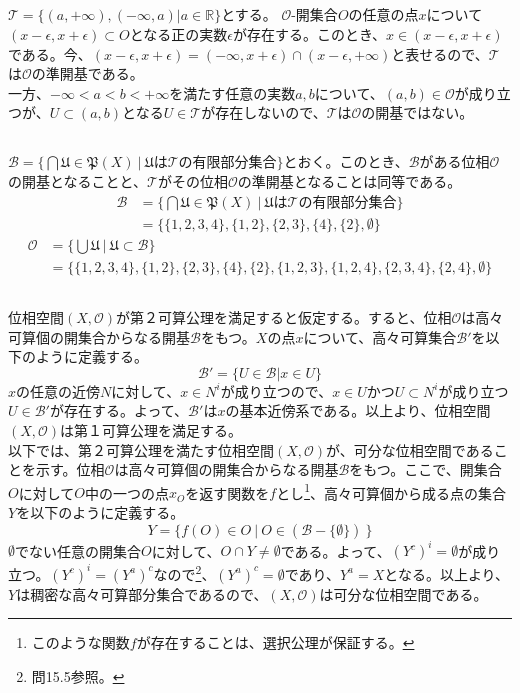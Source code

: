 \documentclass{jsarticle}
\begin{document}
\subsection{}
$\mathcal{T}=\{(a,+\infty),(-\infty,a)|a\in\mathbb{R}\}$とする。
$\mathcal{O}$-開集合$O$の任意の点$x$について$(x-\epsilon,x+\epsilon)\subset O$となる正の実数$\epsilon$が存在する。このとき、$x\in(x-\epsilon,x+\epsilon)$である。今、$(x-\epsilon,x+\epsilon)=(-\infty,x+\epsilon)\cap(x-\epsilon,+\infty)$と表せるので、$\mathcal{T}$は$\mathcal{O}$の準開基である。\\
一方、$-\infty<a<b<+\infty$を満たす任意の実数$a,b$について、$(a,b)\in\mathcal{O}$が成り立つが、$U\subset(a,b)$となる$U\in\mathcal{T}$が存在しないので、$\mathcal{T}$は$\mathcal{O}$の開基ではない。


\subsection{}
$\mathcal{B}=\{\bigcap\mathfrak{U}\in\mathfrak{P}(X)\ |\ \mathfrak{U}は\mathcal{T}の有限部分集合\}$とおく。このとき、$\mathcal{B}$がある位相$\mathcal{O}$の開基となることと、$\mathcal{T}$がその位相$\mathcal{O}$の準開基となることは同等である。
\begin{align*}
\mathcal{B}&=\{\bigcap\mathfrak{U}\in\mathfrak{P}(X)\ |\ \mathfrak{U}は\mathcal{T}の有限部分集合\}\\
&=\{\{1,2,3,4\},\{1,2\},\{2,3\},\{4\},\{2\},\emptyset\}
\end{align*}
\begin{align*}
\mathcal{O}&=\{\bigcup\mathfrak{U}\ |\ \mathfrak{U}\subset\mathcal{B}\}\\
&=\{\{1,2,3,4\},\{1,2\},\{2,3\},\{4\},\{2\},\{1,2,3\},\{1,2,4\},\{2,3,4\},\{2,4\},\emptyset\}
\end{align*}



\subsection{}
位相空間$(X,\mathcal{O})$が第２可算公理を満足すると仮定する。すると、位相$\mathcal{O}$は高々可算個の開集合からなる開基$\mathcal{B}$をもつ。$X$の点$x$について、高々可算集合$\mathcal{B}'$を以下のように定義する。
\[\mathcal{B}'=\{U\in\mathcal{B}| x\in U\}\]
$x$の任意の近傍$N$に対して、$x\in N^i$が成り立つので、$x\in U$かつ$U\subset N^i$が成り立つ$U\in\mathcal{B}'$が存在する。よって、$\mathcal{B}'$は$x$の基本近傍系である。以上より、位相空間$(X,\mathcal{O})$は第１可算公理を満足する。\\
以下では、第２可算公理を満たす位相空間$(X,\mathcal{O})$が、可分な位相空間であることを示す。位相$\mathcal{O}$は高々可算個の開集合からなる開基$\mathcal{B}$をもつ。ここで、開集合$O$に対して$O$中の一つの点$x_O$を返す関数を$f$とし\footnote{このような関数$f$が存在することは、選択公理が保証する。}、高々可算個から成る点の集合$Y$を以下のように定義する。
\[Y=\{f(O)\in O\ |\ O\in(\mathcal{B}-\{\emptyset\})\ \}\]
$\emptyset$でない任意の開集合$O$に対して、$O\cap Y\neq \emptyset$である。よって、$(Y^c)^i=\emptyset$が成り立つ。$(Y^c)^i=(Y^a)^c$なので\footnote{問15.5参照。}、$(Y^a)^c=\emptyset$であり、$Y^a=X$となる。以上より、$Y$は稠密な高々可算部分集合であるので、$(X,\mathcal{O})$は可分な位相空間である。
\end{document}
